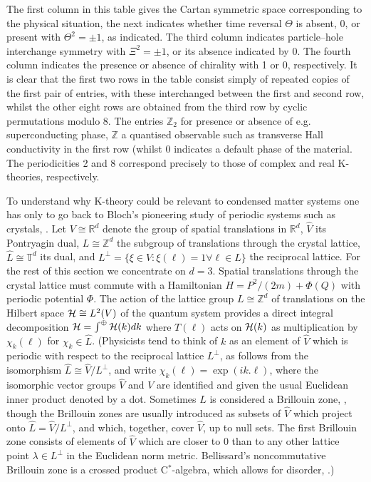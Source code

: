 \documentclass[11pt]{article}
\newcommand{\real}{{\mathbb R}}
\newcommand{\torus}{{\mathbb T}}
\newcommand{\integer}{{\mathbb Z}}
\newcommand{\hilb}{{\cal H}}
\newcommand{\wh}[1]{\widehat{#1}}
\begin{document}
\bigskip
The first column in this table gives the Cartan symmetric space corresponding to the physical situation, the next indicates whether time reversal $\Theta$ is absent, 0, or present with $\Theta^2 = \pm 1$, as indicated. The third column indicates particle--hole interchange symmetry with $\Xi^2 = \pm1$, or its absence indicated by 0. The fourth column indicates the presence  or absence of chirality with 1 or 0, respectively. 
It is clear that the first two rows in the table consist simply of repeated copies of the first pair of entries, with these interchanged between the first and second row, whilst the other eight rows  are obtained from the third row by cyclic permutations modulo 8.
The entries $\integer_2$ for presence or absence of e.g. superconducting phase, $\integer$ a quantised  observable such as transverse Hall conductivity in the first row (whilst 0 indicates a default phase of the material.
The periodicities 2 and 8 correspond precisely to those of complex and real K-theories, respectively.


To understand why K-theory could be relevant to condensed matter systems one has only to go back to 
Bloch's pioneering study of periodic systems such as crystals, \cite{Blo}.
Let $V \cong \real^d$ denote the group of spatial translations in $\real^d$, $\wh{V}$ its Pontryagin dual, $L\cong \integer^d$ the subgroup of translations through the crystal lattice, $\wh{L}\cong \torus^d$ its dual, and $L^\perp = \{\xi\in \wh{V}:\xi(\ell) = 1 \forall \ell \in L \}$ the reciprocal lattice.
For the rest of this section we concentrate on $d=3$.
Spatial translations through the crystal lattice must commute with a Hamiltonian $H = P^2/(2m) + \Phi(Q)$ with periodic potential $\Phi$.
The action of the lattice group $L \cong \integer^d$ of translations on the Hilbert space $\hilb\cong L^2(V)$ of the quantum system provides a direct integral decomposition $\hilb = \int^\oplus \hilb(k) dk$ where $T(\ell)$ acts on $\hilb(k)$  as multiplication by $\chi_k(\ell)$ for $\chi_k \in \wh{L}$. (Physicists tend to think of $k$ as an element of $\wh{V}$ which is periodic with respect to the reciprocal lattice $L^\perp$, as follows from the isomorphism $\wh{L} \cong \wh{V}/L^\perp$, and write $\chi_k(\ell) = \exp(ik.\ell)$, where the isomorphic vector groups $\wh{V}$ and $V$ are identified and given the usual Euclidean inner product denoted by a dot.  Sometimes $\wh{L}$ is considered a Brillouin zone, \cite{TKNN}, though the Brillouin zones are usually introduced as subsets of $\wh{V}$  which project  onto $\wh{L} = \wh{V}/L^\perp$, and which, together, cover $\wh{V}$,  up to null sets.  The first Brillouin zone consists of elements of $\wh{V}$ which are closer to 0  than to any other lattice point $\lambda \in L^\perp$  in the Euclidean norm metric. Bellissard's noncommutative Brillouin zone is a crossed product C$^*$-algebra, which allows for disorder, \cite{B,BES}.)
\end{document}
